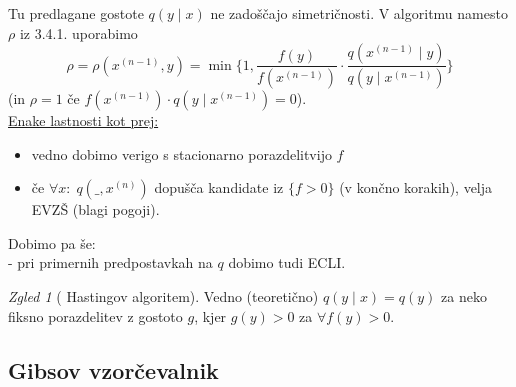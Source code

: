 \documentclass[a4paper, 12pt]{book}
\theoremstyle{definition}
\theoremstyle{remark}
\newtheorem*{exmp}{Zgled}
\begin{document}
Tu predlagane gostote $q(y \mid x)$ ne zadoščajo simetričnosti.
V algoritmu namesto $\rho$ iz 3.4.1. uporabimo
\begin{equation*}
  \rho = \rho\left(x^{(n-1)}, y\right) = \min \{1, \frac{f(y)}{f\left(x^{(n-1)}\right)} \cdot
    \frac{q\left(x^{(n-1)} \mid y\right)}{q\left(y \mid x^{(n-1)}\right)}\}
\end{equation*}
(in $\rho = 1$ če $f\left(x^{(n-1)}\right) \cdot q\left(y \mid x^{(n-1)}\right) = 0$). \\
\underline{Enake lastnosti kot prej:}
\begin{itemize}
  \item vedno dobimo verigo s stacionarno porazdelitvijo $f$
  \item če $\forall x: \; q(\_, x^{(n)})$ dopušča kandidate iz $\{f > 0\}$ (v končno korakih), velja EVZŠ (blagi pogoji).
\end{itemize}
Dobimo pa še: \\
- pri primernih predpostavkah na $q$ dobimo tudi ECLI.
\begin{exmp}[ Hastingov algoritem]
  Vedno  (teoretično) $q(y \mid x) = q(y)$ za neko fiksno porazdelitev z gostoto $g$, kjer $g(y) > 0$ za $\forall f(y) > 0$.
\end{exmp}



\subsection{Gibsov vzorčevalnik}
\end{document}
